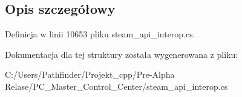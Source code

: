 \subsection{Opis szczegółowy}


Definicja w linii 10653 pliku steam\+\_\+api\+\_\+interop.\+cs.



Dokumentacja dla tej struktury została wygenerowana z pliku\+:\begin{DoxyCompactItemize}
\item 
C\+:/\+Users/\+Pathfinder/\+Projekt\+\_\+cpp/\+Pre-\/\+Alpha Relase/\+P\+C\+\_\+\+Master\+\_\+\+Control\+\_\+\+Center/steam\+\_\+api\+\_\+interop.\+cs\end{DoxyCompactItemize}
